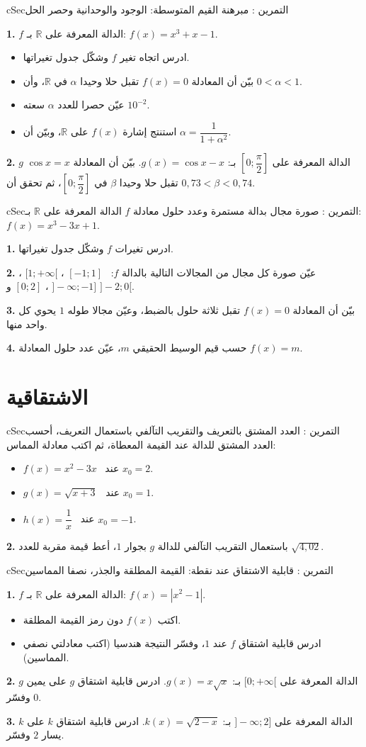 \documentclass[12pt,a4paper]{article}
\newenvironment{BOX}[2]{\begin{otherlanguage}{english}\begin{arbox}{#1}{#2}}{\end{arbox}\end{otherlanguage}}
\newcounter{exo}
\newenvironment{tamrin}[1]{\stepcounter{exo}\begin{BOX}{cSec}{التمرين \theexo: #1}}{\end{BOX}}
\newcommand{\R}{\mathbb{R}}
\newenvironment{sq}{\begin{itemize}[leftmargin=2.4em,itemsep=3pt]}{\end{itemize}}
\newcommand{\qa}{\item[(أ)]}\newcommand{\qb}{\item[(ب)]}\newcommand{\qc}{\item[(جـ)]}\newcommand{\qd}{\item[(د)]}\newcommand{\qe}{\item[(هـ)]}
\newcommand{\QQ}[1]{\par\smallskip\textbf{#1.} }
\begin{document}
\begin{tamrin}{مبرهنة القيم المتوسطة: الوجود والوحدانية وحصر الحل}
\QQ{1} $f$ الدالة المعرفة على $\R$ بـ: $f(x)=x^{3}+x-1$.
\begin{sq}
\qa ادرس اتجاه تغير $f$ وشكّل جدول تغيراتها.
\qb بيّن أن المعادلة $f(x)=0$ تقبل حلا وحيدا $\alpha$ في $\R$، وأن $0<\alpha<1$.
\qc عيّن حصرا للعدد $\alpha$ سعته $10^{-2}$.
\qd استنتج إشارة $f(x)$ على $\R$، وبيّن أن $\alpha=\dfrac{1}{1+\alpha^{2}}$.
\end{sq}
\QQ{2} $g$ الدالة المعرفة على $\left[0;\dfrac{\pi}{2}\right]$ بـ: $g(x)=\cos x-x$. بيّن أن المعادلة $\cos x=x$ تقبل حلا وحيدا $\beta$ في $\left[0;\dfrac{\pi}{2}\right]$، ثم تحقق أن $0{,}73<\beta<0{,}74$.
\end{tamrin}

\begin{tamrin}{صورة مجال بدالة مستمرة وعدد حلول معادلة}
$f$ الدالة المعرفة على $\R$ بـ: $f(x)=x^{3}-3x+1$.
\QQ{1} ادرس تغيرات $f$ وشكّل جدول تغيراتها.
\QQ{2} عيّن صورة كل مجال من المجالات التالية بالدالة $f$: \ $[-1;1]$ ، $[1;+\infty[$ ، $]-\infty;-1]$ ، $[0;2]$ و $]-2;0[$.
\QQ{3} بيّن أن المعادلة $f(x)=0$ تقبل ثلاثة حلول بالضبط، وعيّن مجالا طوله $1$ يحوي كل واحد منها.
\QQ{4} حسب قيم الوسيط الحقيقي $m$، عيّن عدد حلول المعادلة $f(x)=m$.
\end{tamrin}
\section{الاشتقاقية}
\begin{tamrin}{العدد المشتق بالتعريف والتقريب التآلفي}
باستعمال التعريف، أحسب العدد المشتق للدالة عند القيمة المعطاة، ثم اكتب معادلة المماس:
\begin{sq}
\qa $f(x)=x^{2}-3x$ \ عند $x_0=2$.
\qb $g(x)=\sqrt{x+3}$ \ عند $x_0=1$.
\qc $h(x)=\dfrac{1}{x}$ \ عند $x_0=-1$.
\end{sq}
\QQ{2} باستعمال التقريب التآلفي للدالة $g$ بجوار $1$، أعط قيمة مقربة للعدد $\sqrt{4{,}02}$.
\end{tamrin}

\begin{tamrin}{قابلية الاشتقاق عند نقطة: القيمة المطلقة والجذر، نصفا المماسين}
\QQ{1} $f$ الدالة المعرفة على $\R$ بـ: $f(x)=\left|x^{2}-1\right|$.
\begin{sq}
\qa اكتب $f(x)$ دون رمز القيمة المطلقة.
\qb ادرس قابلية اشتقاق $f$ عند $1$، وفسّر النتيجة هندسيا (اكتب معادلتي نصفي المماسين).
\end{sq}
\QQ{2} $g$ الدالة المعرفة على $[0;+\infty[$ بـ: $g(x)=x\sqrt{x}$. ادرس قابلية اشتقاق $g$ على يمين $0$ وفسّر.
\QQ{3} $k$ الدالة المعرفة على $]-\infty;2]$ بـ: $k(x)=\sqrt{2-x}$. ادرس قابلية اشتقاق $k$ على يسار $2$ وفسّر.
\end{tamrin}
\end{document}

